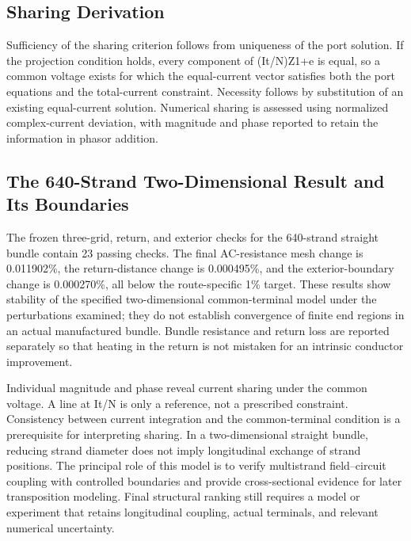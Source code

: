 \documentclass[journal,10pt]{IEEEtran}
\begin{document}
\subsection*{Sharing Derivation}
\hypertarget{04.sharing_derivation.heading}{}
Sufficiency of the sharing criterion follows from uniqueness of the port solution. If the projection condition holds, every component of (It/N)Z1+e is equal, so a common voltage exists for which the equal-current vector satisfies both the port equations and the total-current constraint. Necessity follows by substitution of an existing equal-current solution. Numerical sharing is assessed using normalized complex-current deviation, with magnitude and phase reported to retain the information in phasor addition.


\subsection*{The 640-Strand Two-Dimensional Result and Its Boundaries}
\hypertarget{04.coax_results.heading}{}
The frozen three-grid, return, and exterior checks for the 640-strand straight bundle contain 23 passing checks. The final AC-resistance mesh change is 0.011902\%, the return-distance change is 0.000495\%, and the exterior-boundary change is 0.000270\%, all below the route-specific 1\% target. These results show stability of the specified two-dimensional common-terminal model under the perturbations examined; they do not establish convergence of finite end regions in an actual manufactured bundle. Bundle resistance and return loss are reported separately so that heating in the return is not mistaken for an intrinsic conductor improvement.


Individual magnitude and phase reveal current sharing under the common voltage. A line at It/N is only a reference, not a prescribed constraint. Consistency between current integration and the common-terminal condition is a prerequisite for interpreting sharing. In a two-dimensional straight bundle, reducing strand diameter does not imply longitudinal exchange of strand positions. The principal role of this model is to verify multistrand field–circuit coupling with controlled boundaries and provide cross-sectional evidence for later transposition modeling. Final structural ranking still requires a model or experiment that retains longitudinal coupling, actual terminals, and relevant numerical uncertainty.
\end{document}
